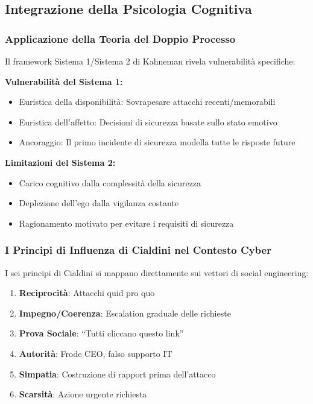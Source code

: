 \documentclass[11pt,a4paper]{article}
\begin{document}
\subsection{Integrazione della Psicologia Cognitiva}

\subsubsection{Applicazione della Teoria del Doppio Processo}

Il framework Sistema 1/Sistema 2 di Kahneman\cite{kahneman2011} rivela vulnerabilità specifiche:

\textbf{Vulnerabilità del Sistema 1:}
\begin{itemize}
\item Euristica della disponibilità: Sovrapesare attacchi recenti/memorabili
\item Euristica dell'affetto: Decisioni di sicurezza basate sullo stato emotivo
\item Ancoraggio: Il primo incidente di sicurezza modella tutte le risposte future
\end{itemize}

\textbf{Limitazioni del Sistema 2:}
\begin{itemize}
\item Carico cognitivo dalla complessità della sicurezza
\item Deplezione dell'ego dalla vigilanza costante
\item Ragionamento motivato per evitare i requisiti di sicurezza
\end{itemize}

\subsubsection{I Principi di Influenza di Cialdini nel Contesto Cyber}

I sei principi di Cialdini\cite{cialdini2007} si mappano direttamente sui vettori di social engineering:
\begin{enumerate}
\item \textbf{Reciprocità}: Attacchi quid pro quo
\item \textbf{Impegno/Coerenza}: Escalation graduale delle richieste
\item \textbf{Prova Sociale}: ``Tutti cliccano questo link''
\item \textbf{Autorità}: Frode CEO, falso supporto IT
\item \textbf{Simpatia}: Costruzione di rapport prima dell'attacco
\item \textbf{Scarsità}: Azione urgente richiesta
\end{enumerate}
\end{document}
